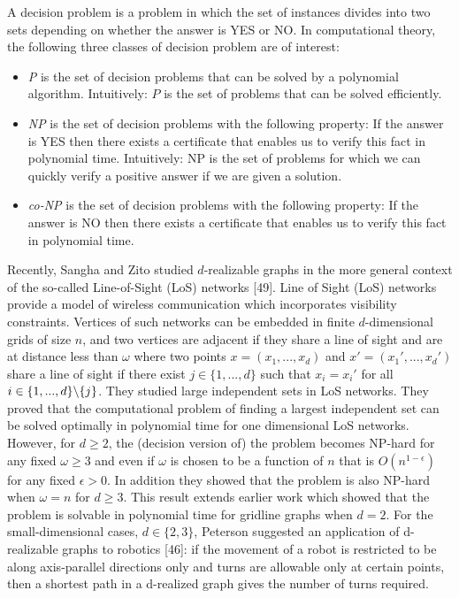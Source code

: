 \documentclass[12pt,a4paper,titlepage,openany]{report}
\begin{document}
A decision problem is a problem in which the set of instances divides into two sets depending on whether the answer is YES or NO.
In computational theory, the following three classes of decision problem are of interest:
\begin{itemize}
\item {\it P} is the set of decision problems that can be solved by a polynomial algorithm. Intuitively: $P$ is the set of problems that can be solved efficiently.
\item {\it NP} is the set of decision problems with the following property:
If the answer is YES then there exists a certificate that
enables us to verify this fact in polynomial time. Intuitively: NP is the set of problems for which we can
quickly verify a positive answer if we are given a solution.
\item {\it co-NP} is the set of decision problems with the following property:
If the answer is NO then there exists a certificate that
enables us to verify this fact in polynomial time.
\end{itemize}


Recently, Sangha and Zito studied $d$-realizable graphs in the more general context of the so-called Line-of-Sight (LoS) networks [49]. Line of Sight (LoS) networks provide a model of wireless communication which incorporates visibility constraints. Vertices of such networks can be embedded in finite $d$-dimensional grids of size $n$, and two vertices are adjacent if they share a line of sight and are at distance less than $\omega$ where two points $x=(x_1,...,x_d)$ and $x'=(x_1',...,x_d')$ share a line of sight if there exist $j\in \{1,...,d\}$ such that $x_i=x_i'$ for all $i\in \{1,...,d\} \symbol{92} \{j\}$. They studied large independent sets in LoS networks. They proved that the computational problem of finding a largest independent
set can be solved optimally in polynomial time for one dimensional LoS networks. However, for $d \geq 2$, the (decision version of) the problem becomes NP-hard for any fixed $\omega \geq 3$ and even if $ω$ is chosen to be a
function of $n$ that is $O(n^{1-\epsilon})$ for any fixed $\epsilon>0$. In addition they showed that the problem is also NP-hard when $\omega = n$ for $d \geq 3$. This result
extends earlier work which showed that the problem is solvable in polynomial time for gridline graphs when $d = 2$.\newline
For the small-dimensional cases, $d \in \{2, 3\}$, Peterson suggested an application of d-realizable graphs to robotics [46]: if the movement of a robot is restricted to be along axis-parallel directions only and turns are
allowable only at certain points, then a shortest path in a d-realized graph gives the number of turns required.
\end{document}
